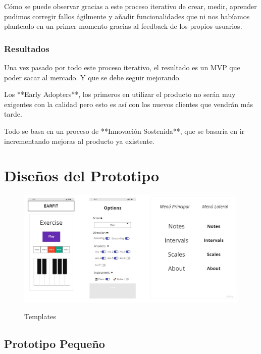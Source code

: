 \documentclass[12pt,twoside,titlepage]{report}
\begin{document}
{Cómo se puede observar gracias a este proceso iterativo de crear, medir, aprender pudimos corregir fallos ágilmente y añadir funcionalidades que ni nos habíamos planteado en un primer momento gracias al feedback de los propios usuarios.

\subsection{Resultados}

Una vez pasado por todo este proceso iterativo, el resultado es un MVP que poder sacar al mercado. Y que se debe seguir mejorando. 

Los **Early Adopters**, los primeros en utilizar el producto no serán muy exigentes con la calidad pero esto es así con los nuevos clientes que vendrán más tarde. 

Todo se basa en un proceso de **Innovación Sostenida**, que se basaría en ir incrementando mejoras al producto ya existente.

\chapter{Diseños del Prototipo}

\begin{figure}[H]
    \centering
    \includegraphics[scale=0.28]{Design Thinking/Prototipo/Small/Templates}
    \label{fig:Templates}
    \caption{Templates}
\end{figure}

\section{Prototipo Pequeño}

}
\end{document}
